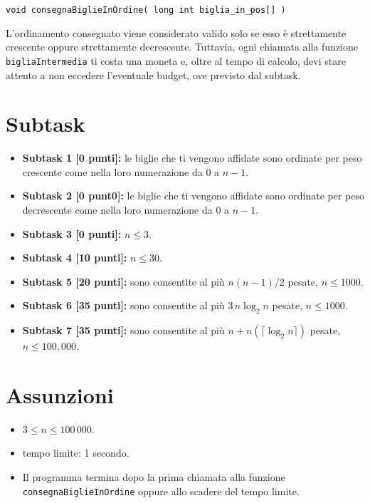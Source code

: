 \documentclass[a4paper,11pt]{article}
\begin{document}
  \noindent
  \texttt{void consegnaBiglieInOrdine( long int biglia\_in\_pos[] )}

  \vspace{0.4cm}
  
  \noindent
  L'ordinamento consegnato viene considerato valido solo se
  esso \`e strettamente crescente oppure strettamente decrescente.
  Tuttavia, ogni chiamata alla funzione \texttt{bigliaIntermedia}
  ti costa una moneta e, oltre al tempo di calcolo, devi stare attento a non eccedere l'eventuale budget, ove previsto dal subtask.
  
  
  \section*{Subtask}
  \begin{itemize}
    \item \textbf{Subtask 1 [0 punti]:} le biglie che ti vengono affidate
       sono ordinate per peso crescente come nella loro numerazione da $0$ a $n-1$.
    \item \textbf{Subtask 2 [0 punt0]:} le biglie che ti vengono affidate
       sono ordinate per peso decrescente come nella loro numerazione da $0$ a $n-1$.
    \item \textbf{Subtask 3 [0 punti]:} $n \leq 3$.
    \item \textbf{Subtask 4 [10 punti]:} $n \leq 30$.
    \item \textbf{Subtask 5 [20 punti]:} sono consentite al pi\`u $n(n-1)/2$ pesate, $n \leq 1000$.
    \item \textbf{Subtask 6 [35 punti]:} sono consentite al pi\`u $3\,n\log_2 n$ pesate, $n \leq 1000$.
    \item \textbf{Subtask 7 [35 punti]:} sono consentite al pi\`u $n + n(\lceil \log_2 n \rceil )$ pesate, $n \leq 100,000$.
  \end{itemize}
  
  \section*{Assunzioni}
  \begin{itemize}[nolistsep, noitemsep]
    \item $3 \le n \le 100\,000$.
    \item tempo limite: 1 secondo.
    \item Il programma termina dopo la prima chiamata alla funzione \texttt{consegnaBiglieInOrdine} oppure allo scadere del tempo limite.
  \end{itemize}
\end{document}
